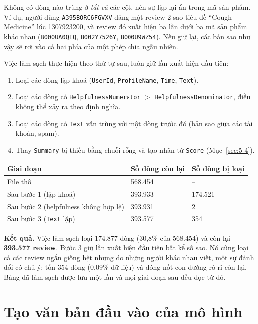 Không có dòng nào trùng ở \emph{tất cả} các cột, nên sự lặp lại ẩn trong mã sản phẩm. Ví dụ, người dùng \texttt{A395BORC6FGVXV} đăng một review 2 sao tiêu đề ``Cough Medicine'' lúc 1307923200, và review đó xuất hiện ba lần dưới ba mã sản phẩm khác nhau (\texttt{B000UA0QIQ}, \texttt{B002Y7526Y}, \texttt{B000U9WZ54}). Nếu giữ lại, các bản sao như vậy sẽ rơi vào cả hai phía của một phép chia ngẫu nhiên.

Việc làm sạch thực hiện theo thứ tự sau, luôn giữ lần xuất hiện đầu tiên:
\begin{enumerate}
    \item Loại các dòng lặp khoá (\texttt{UserId}, \texttt{ProfileName}, \texttt{Time}, \texttt{Text}).
    \item Loại các dòng có \texttt{HelpfulnessNumerator} $>$ \texttt{HelpfulnessDenominator}, điều không thể xảy ra theo định nghĩa.
    \item Loại các dòng có \texttt{Text} vẫn trùng với một dòng trước đó (bản sao giữa các tài khoản, spam).
    \item Thay \texttt{Summary} bị thiếu bằng chuỗi rỗng và tạo nhãn từ \texttt{Score} (Mục~\ref{sec:5-4}).
\end{enumerate}

\begin{center}
\begin{tabular}{@{}p{7cm}p{3cm}p{3cm}@{}}
    \toprule
    Giai đoạn & Số dòng còn lại & Số dòng bị loại \\
    \midrule
    File thô & 568.454 & -- \\
    Sau bước 1 (lặp khoá) & 393.933 & 174.521 \\
    Sau bước 2 (helpfulness không hợp lệ) & 393.931 & 2 \\
    Sau bước 3 (\texttt{Text} lặp) & 393.577 & 354 \\
    \bottomrule
\end{tabular}
\end{center}

\textbf{Kết quả.} Việc làm sạch loại 174.877 dòng (30,8\% của 568.454) và còn lại \textbf{393.577 review}. Bước 3 giữ lần xuất hiện đầu tiên bất kể số sao. Nó cũng loại cả các review ngắn giống hệt nhưng do những người khác nhau viết, một sự đánh đổi có chủ ý: tốn 354 dòng (0,09\% dữ liệu) và đóng nốt con đường rò rỉ còn lại. Bảng đã làm sạch được lưu một lần và mọi giai đoạn sau đều đọc từ đó.

\section{Tạo văn bản đầu vào của mô hình}
\label{sec:5-3}

